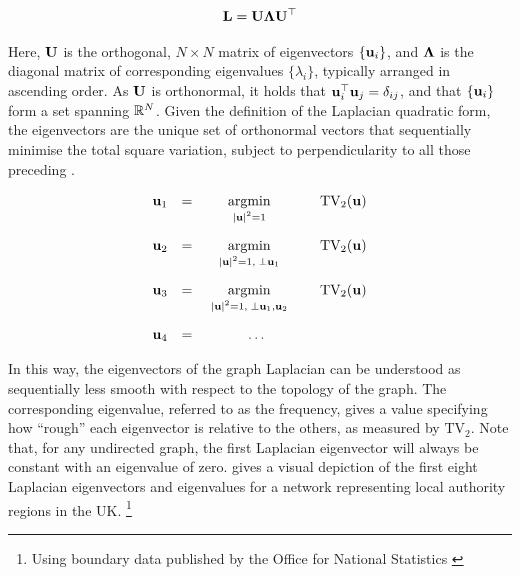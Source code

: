 \begin{equation}
    \mathbf{L} = \mathbf{U} \mathbf{\Lambda} \mathbf{U}^\top
\end{equation}

Here, $\mathbf{U}$ is the orthogonal, $N \times N$ matrix of eigenvectors $\{\mathbf{u}_i\}$, and $\mathbf{\Lambda}$ is the diagonal matrix of corresponding eigenvalues $\{\lambda_i\}$, typically arranged in ascending order. As $\mathbf{U}$ is orthonormal, it holds that $\mathbf{u}_i^\top \mathbf{u}_j = \delta_{ij}$, and that $\{\mathbf{u}_i\}$ form a set spanning $\mathbb{R}^N$. Given the definition of the Laplacian quadratic form, the eigenvectors are the unique set of orthonormal vectors that sequentially minimise the total square variation, subject to perpendicularity to all those preceding \citep{Spielman2019}.


$$
\begin{matrix}
    \uu_1 & = & \underset{\raisebox{-0.1cm} { $ \scriptstyle |\uu|^2 = 1$ }}{\text{argmin}} \quad & \text{TV}_2(\uu) \\[0.7cm]
    \uu_2 & = & \underset{\raisebox{-0.1cm} { $ \scriptstyle |\uu|^2 = 1, \; \perp \uu_1$ }}{\text{argmin}} \quad & \text{TV}_2(\uu) \\[0.7cm]
    \uu_3 & = & \underset{\raisebox{-0.1cm} { $ \scriptstyle |\uu|^2 = 1, \;\perp \uu_1, \uu_2$ }}{\text{argmin}} \quad & \text{TV}_2(\uu) \\[0.7cm]
    \uu_4 & = & \ldots
\end{matrix}
$$

\newpage

In this way, the eigenvectors of the graph Laplacian can be understood as sequentially less smooth with respect to the topology of the graph. The corresponding eigenvalue, referred to as the frequency, gives a value specifying how ``rough'' each eigenvector is relative to the others, as measured by $\text{TV}_2$. Note that, for any undirected graph, the first Laplacian eigenvector will always be constant with an eigenvalue of zero.  gives a visual depiction of the first eight Laplacian eigenvectors and eigenvalues for a network representing local authority regions in the UK. \footnote{Using boundary data published by the Office for National Statistics \citep{ONS2019}}  

